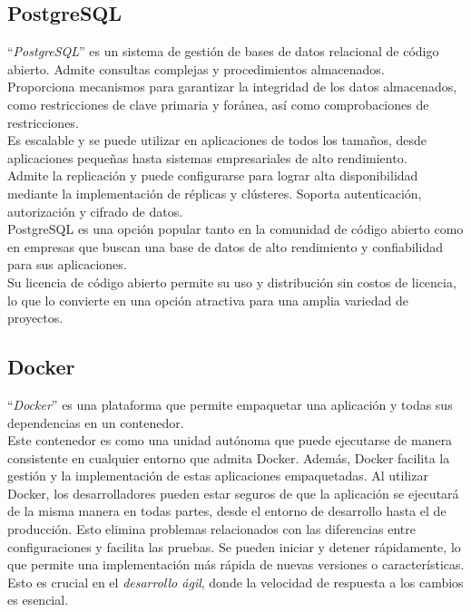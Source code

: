 \subsection{PostgreSQL~\cite{juba2015learning}}
``\emph{PostgreSQL}'' es un sistema de gestión de bases de datos relacional de código abierto. 
Admite consultas complejas y procedimientos almacenados.\\
Proporciona mecanismos para garantizar la integridad de los datos almacenados, 
como restricciones de clave primaria y foránea, así como comprobaciones de restricciones.\\
Es escalable y se puede utilizar en aplicaciones de todos los tamaños, 
desde aplicaciones pequeñas hasta sistemas empresariales de alto rendimiento.\\
Admite la replicación y puede configurarse para lograr alta disponibilidad mediante 
la implementación de réplicas y clústeres.
Soporta autenticación, autorización y cifrado de datos.\\
PostgreSQL es una opción popular tanto en la comunidad de código abierto como 
en empresas que buscan una base de datos de alto rendimiento y confiabilidad para sus aplicaciones.\\
Su licencia de código abierto permite su uso y distribución sin costos de licencia, 
lo que lo convierte en una opción atractiva para una amplia variedad de proyectos.

\subsection{Docker~\cite{garzas2105docker}}
``\emph{Docker}'' es una plataforma que permite empaquetar una aplicación y 
todas sus dependencias en un contenedor.\\
Este contenedor es como una unidad autónoma que puede ejecutarse de manera 
consistente en cualquier entorno que admita Docker. 
Además, Docker facilita la gestión y la implementación de estas aplicaciones empaquetadas.
Al utilizar Docker, los desarrolladores pueden estar seguros de que la aplicación 
se ejecutará de la misma manera en todas partes, desde el entorno de desarrollo hasta el de producción. 
Esto elimina problemas relacionados con las diferencias entre configuraciones y facilita las pruebas.
Se pueden iniciar y detener rápidamente, lo que permite una implementación más rápida de 
nuevas versiones o características. \\
Esto es crucial en el \emph{desarrollo ágil}, donde la velocidad de respuesta a los cambios es esencial.

